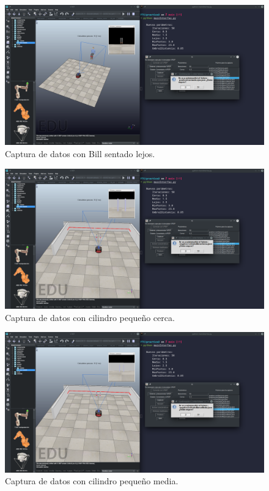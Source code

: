 \documentclass[12pt, spanish]{article}
\begin{document}
\begin{figure}[H]
    \centering
    \includegraphics[width=\textwidth]{sentado_lejos.png}
    \caption{Captura de datos con Bill sentado lejos.}
\end{figure}





\begin{figure}[H]
    \centering
    \includegraphics[width=\textwidth]{cilindro_p_cerca.png}
    \caption{Captura de datos con cilindro pequeño cerca.}
\end{figure}

\begin{figure}[H]
    \centering
    \includegraphics[width=\textwidth]{cilindro_p_media.png}
    \caption{Captura de datos con cilindro pequeño media.}
\end{figure}
\end{document}

